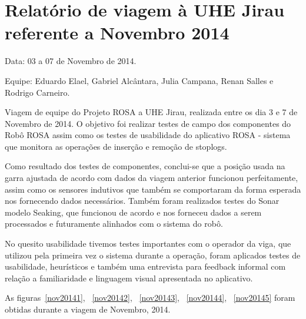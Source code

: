 \section{Relatório de viagem à UHE Jirau
referente a Novembro 2014}
Data: 03 a 07 de Novembro de 2014.

Equipe: Eduardo Elael, Gabriel Alcântara, Julia Campana, Renan Salles e Rodrigo Carneiro.


Viagem de equipe do Projeto ROSA a UHE Jirau, realizada entre
os dia 3 e 7 de Novembro de 2014. O objetivo foi realizar testes de campo dos
componentes do Robô ROSA assim como os testes de usabilidade do aplicativo ROSA
- sistema que monitora as operações de inserção e remoção de stoplogs.

Como resultado dos testes de componentes, conclui-se que a posição usada na
garra ajustada de acordo com dados da viagem anterior funcionou
perfeitamente, assim como  os sensores indutivos que também se comportaram da
forma esperada nos fornecendo dados necessários.  Também foram realizados
testes do Sonar modelo Seaking, que funcionou de acordo e nos forneceu dados a
serem processados e futuramente alinhados com o sistema do robô.

No quesito usabilidade tivemos testes importantes com o operador da viga, que
utilizou pela primeira vez o sistema durante a operação, foram aplicados
testes de usabilidade, heurísticos e também uma entrevista para feedback
informal com relação a familiaridade e linguagem visual apresentada no
aplicativo.

As figuras~\ref{nov20141}, ~\ref{nov20142}, ~\ref{nov20143}, ~\ref{nov20144},
~\ref{nov20145} foram obtidas durante a viagem de Novembro, 2014.


